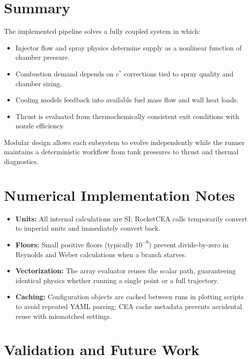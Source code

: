 \documentclass[12pt]{article}
\begin{document}
\section{Summary}

The implemented pipeline solves a fully coupled system in which:
\begin{itemize}
    \item Injector flow and spray physics determine supply as a nonlinear function of chamber pressure.
    \item Combustion demand depends on $c^*$ corrections tied to spray quality and chamber sizing.
    \item Cooling models feedback into available fuel mass flow and wall heat loads.
    \item Thrust is evaluated from thermochemically consistent exit conditions with nozzle efficiency.
\end{itemize}
Modular design allows each subsystem to evolve independently while the runner maintains a deterministic workflow from tank pressures to thrust and thermal diagnostics.

\section{Numerical Implementation Notes}

\begin{itemize}
    \item \textbf{Units:} All internal calculations are SI; RocketCEA calls temporarily convert to imperial units and immediately convert back.
    \item \textbf{Floors:} Small positive floors (typically $10^{-9}$) prevent divide-by-zero in Reynolds and Weber calculations when a branch starves.
    \item \textbf{Vectorization:} The array evaluator reuses the scalar path, guaranteeing identical physics whether running a single point or a full trajectory.
    \item \textbf{Caching:} Configuration objects are cached between runs in plotting scripts to avoid repeated YAML parsing; CEA cache metadata prevents accidental reuse with mismatched settings.
\end{itemize}

\section{Validation and Future Work}
\end{document}
